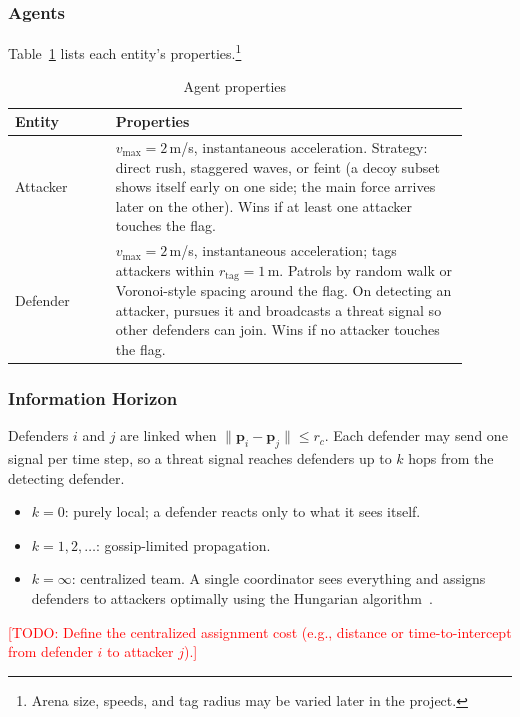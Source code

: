 \documentclass[conference]{IEEEtran}
\newcommand{\todo}[1]{\textcolor{red}{[TODO: #1]}}
\newcommand{\hor}{k}           %
\newcommand{\crange}{r_c}      %
\newcommand{\rtag}{r_{\mathrm{tag}}}
\newcommand{\vmax}{v_{\max}}
\begin{document}
\subsubsection{Agents}
Table~\ref{tab:agents} lists each entity's properties.\footnote{Arena size, speeds, and tag radius may be varied later in the project.}

\begin{table}[t]
  \centering
  \caption{Agent properties}
  \label{tab:agents}
  \begin{tabular}{@{}p{0.2\linewidth}p{0.7\linewidth}@{}}
    \toprule
    Entity & Properties \\
    \midrule
    Attacker & $\vmax = 2$\,m/s, instantaneous acceleration. Strategy: direct rush, staggered waves, or feint (a decoy subset shows itself early on one side; the main force arrives later on the other). Wins if at least one attacker touches the flag. \\
    \addlinespace
    Defender & $\vmax = 2$\,m/s, instantaneous acceleration; tags attackers within $\rtag = 1$\,m. Patrols by random walk or Voronoi-style spacing around the flag. On detecting an attacker, pursues it and broadcasts a threat signal so other defenders can join. Wins if no attacker touches the flag. \\
    \bottomrule
  \end{tabular}
\end{table}

\subsubsection{Information Horizon}
Defenders $i$ and $j$ are linked when $\lVert \mathbf{p}_i - \mathbf{p}_j \rVert \le \crange$. Each defender may send one signal per time step, so a threat signal reaches defenders up to $\hor$ hops from the detecting defender.
\begin{itemize}
  \item $\hor = 0$: purely local; a defender reacts only to what it sees itself.
  \item $\hor = 1, 2, \dots$: gossip-limited propagation.
  \item $\hor = \infty$: centralized team. A single coordinator sees everything and assigns defenders to attackers optimally using the Hungarian algorithm~\cite{kuhn1955hungarian}.
\end{itemize}
\todo{Define the centralized assignment cost (e.g., distance or time-to-intercept from defender $i$ to attacker $j$).}
\end{document}

